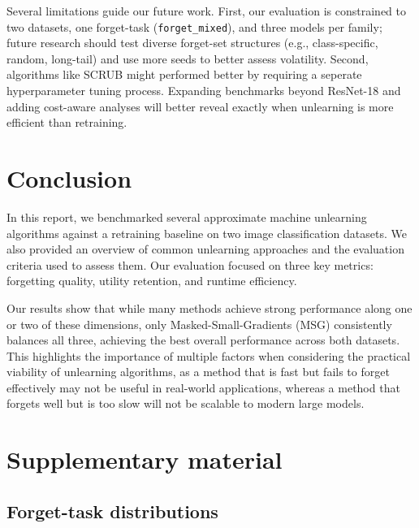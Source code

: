\documentclass{article}
\begin{document}
Several limitations guide our future work. First, our evaluation is constrained to two datasets, one forget-task (\texttt{forget\_mixed}), and three models per family; future research should test diverse forget-set structures (e.g., class-specific, random, long-tail) and use more seeds to better assess volatility. Second, algorithms like SCRUB might performed better by requiring a seperate hyperparameter tuning process. Expanding benchmarks beyond ResNet-18 and adding cost-aware analyses will better reveal exactly when unlearning is more efficient than retraining.
\section{Conclusion}
In this report, we benchmarked several approximate machine unlearning algorithms against a retraining baseline on two image classification datasets. We also provided an overview of common unlearning approaches and the evaluation criteria used to assess them. Our evaluation focused on three key metrics: forgetting quality, utility retention, and runtime efficiency.

Our results show that while many methods achieve strong performance along one or two of these dimensions, only Masked-Small-Gradients (MSG) consistently balances all three, achieving the best overall performance across both datasets. This highlights the importance of multiple factors when considering the practical viability of unlearning algorithms, as a method that is fast but fails to forget effectively may not be useful in real-world applications, whereas a method that forgets well but is too slow will not be scalable to modern large models.

\printbibliography


\newpage
\appendix

\section{Supplementary material} \label{app:info}
\subsection{Forget-task distributions}
\end{document}
